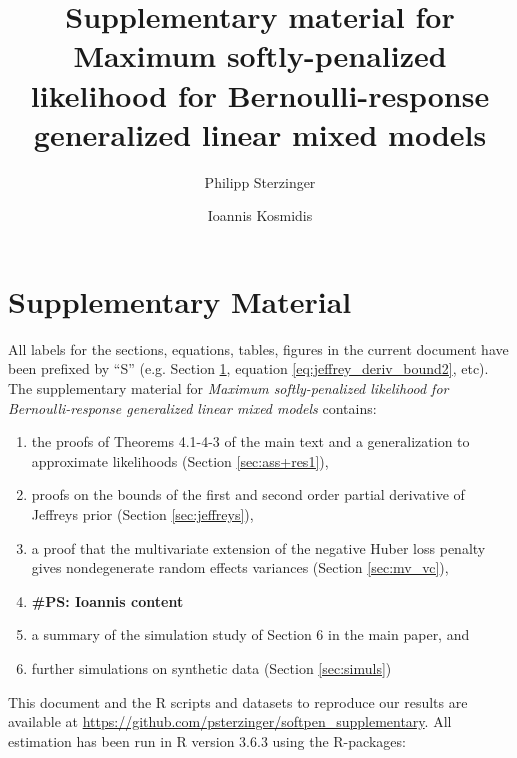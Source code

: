 \documentclass[11pt, a4paper]{article}
\title{Supplementary material for Maximum softly-penalized likelihood for Bernoulli-response generalized linear mixed models}
\author[1]{Philipp Sterzinger}
\author[1,2]{Ioannis Kosmidis}
\affil[1]{Department of Statistics, University of Warwick, Coventry, CV4 7AL, UK}
\affil[2]{The Alan Turing Institute, London, NW1 2DB, UK}
\newcommand{\PS}[1]{{\noindent \color{red} \bf \#PS: #1}}
\theoremstyle{example} \newtheorem{example}{Example}[section]
\theoremstyle{theorem} \newtheorem{theorem}{Theorem}[section]
\theoremstyle{theorem }\newtheorem{proposition}{Proposition}[section]
\theoremstyle{theorem }\newtheorem{corollary}{Corollary}[section]
\begin{document}
	\maketitle
	
	\section{Supplementary Material}
		\label{sec:supp}
	All labels for the sections, equations, tables, figures in the current document have been prefixed by ``S'' (e.g. Section \ref{sec:supp}, equation \eqref{eq:jeffrey_deriv_bound2}, etc). The supplementary material for \textit{Maximum softly-penalized likelihood for Bernoulli-response generalized linear mixed models} contains:
	\begin{enumerate}[label=\roman{*})]
		\item the proofs of Theorems 4.1-4-3 of the main text and a generalization to approximate likelihoods (Section \ref{sec:ass+res1}), 
		\item proofs on the bounds of the first and second order partial derivative of Jeffreys prior (Section \ref{sec:jeffreys}), 
		\item a proof that the multivariate extension of the negative Huber loss penalty gives nondegenerate random effects variances (Section \ref{sec:mv_vc}),
		\item \PS{Ioannis content}  
		\item a summary of the simulation study of Section 6 in the main paper, and
		\item further simulations on synthetic data (Section \ref{sec:simuls})
	\end{enumerate}
	This document and the R scripts and datasets to reproduce our results are available at \linebreak \url{https://github.com/psterzinger/softpen_supplementary}. All estimation has been run in R version 3.6.3 \citep{R} using the R-packages: 
\end{document}
